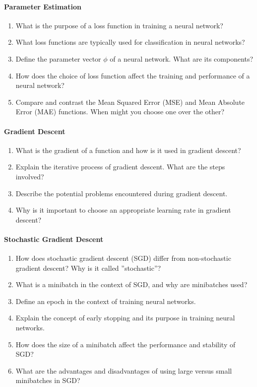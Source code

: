 \paragraph*{Parameter Estimation}
\begin{enumerate}
    \item What is the purpose of a loss function in training a neural network?
    \item What loss functions are typically used for classification in neural networks?
    \item Define the parameter vector $\phi$ of a neural network. What are its components?
    \item How does the choice of loss function affect the training and performance of a neural network?
    \item Compare and contrast the Mean Squared Error (MSE) and Mean Absolute Error (MAE) functions. When might you choose one over the other?
\end{enumerate}
\paragraph*{Gradient Descent}
\begin{enumerate}
    \item What is the gradient of a function and how is it used in gradient descent?
    \item Explain the iterative process of gradient descent. What are the steps involved?
    \item Describe the potential problems encountered during gradient descent.
    \item Why is it important to choose an appropriate learning rate in gradient descent?
\end{enumerate}
\paragraph*{Stochastic Gradient Descent}
\begin{enumerate}
    \item How does stochastic gradient descent (SGD) differ from non-stochastic gradient descent? Why is it called ''stochastic''?
    \item What is a minibatch in the context of SGD, and why are minibatches used?
    \item Define an epoch in the context of training neural networks.
    \item Explain the concept of early stopping and its purpose in training neural networks.
    \item How does the size of a minibatch affect the performance and stability of SGD?
    \item What are the advantages and disadvantages of using large versus small minibatches in SGD?
\end{enumerate}
